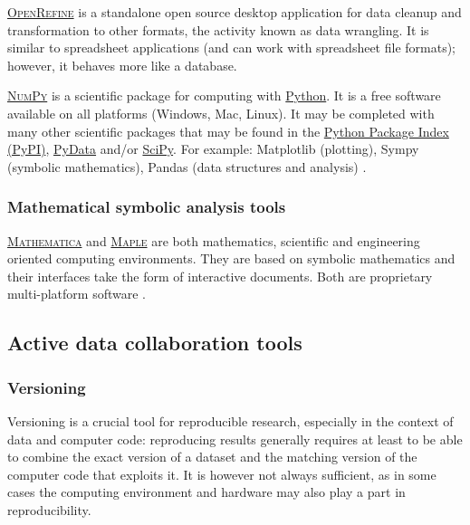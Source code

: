 \vspace{0.4cm}

\noindent {} \textsc{\href{http://openrefine.org}{OpenRefine}} is a standalone open source desktop application for data cleanup and transformation to other formats, the activity known as data wrangling. It is similar to spreadsheet applications (and can work with spreadsheet file formats); however, it behaves more like a database.

\vspace{0.4cm}

\noindent {}  \textsc{\href{http://www.numpy.org}{NumPy}} is a scientific package for computing with \href{http://www.python.org/}{Python}. It is a free software available on all platforms (Windows, Mac, Linux). It may be completed with many other scientific packages that may be found in the \href{https://pypi.python.org/pypi}{Python Package Index (PyPI)}, \href{http://pydata.org/downloads/}{PyData} and/or \href{http://www.scipy.org/}{SciPy}. For example: Matplotlib (plotting), Sympy (symbolic mathematics), Pandas (data structures and analysis) \cite{numpy_numpy_2015,python_software_foundation_python.org_2015,pydata_pydata.org_2015}.

\subsubsection{Mathematical symbolic analysis tools}

\noindent {}  \textsc{\href{http://www.wolfram.com/mathematica/}{Mathematica}} and  \textsc{\href{http://www.maplesoft.com/products/maple/}{Maple}} are both mathematics, scientific and engineering oriented computing environments. They are based on symbolic mathematics and their interfaces take the form of interactive documents. Both are proprietary multi-platform software \cite{maplesoft_maple_2015,wolfram_wolfram_2015}.


\subsection{Active data collaboration tools}

\subsubsection{Versioning}

\noindent Versioning is a crucial tool for reproducible research, especially in the context of data and computer code: reproducing results generally requires at least to be able to combine the exact version of a dataset and the matching version of the computer code that exploits it. It is however not always sufficient, as in some cases the computing environment and hardware may also play a part in reproducibility.

